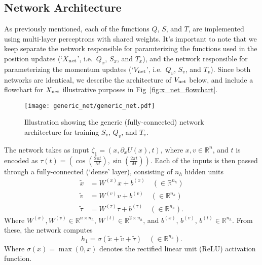 \documentclass[../main.tex]{subfiles}
\begin{document}
\subsection{Network Architecture}
As previously mentioned, each of the functions $Q$, $S$, and $T$, are implemented using multi-layer perceptrons with
shared weights.
%
It's important to note that we keep separate the network responsible for paramterizing the functions used in the
position updates (`${X_{\mathrm{net}}}$', i.e.\ $Q_x$, $S_x$, and $T_x$), and the network responsible for parameterizing the
momentum updates (`${V_{\mathrm{net}}}$', i.e.\ $Q_v$, $S_v$, and $T_v$).
%
Since both networks are identical, we describe the architecture of ${V_{\mathrm{net}}}$ below, and include a flowchart for ${X_{\mathrm{net}}}$ 
illustrative purposes in Fig~\ref{fig:x_net_flowchart}.
%
%
\begin{figure}[htpb]
  \centering
  \texttt{[image: generic\_net/generic\_net.pdf]}
  \caption{Illustration showing the generic (fully-connected) network architecture for training $S_v$, $Q_v$, and
  $T_v$.}%
\label{fig:generic_net}
\end{figure}
%
%
%
The network takes as input $\zeta_1 = (x, \partial_{x} U(x), t)$, where $x, v \in \mathbb{R}^{n}$, and $t$ is encoded
as $\tau(t) = \left(\cos{(\frac{2\pi t}{M})},\right.  \left.\sin{(\frac{2\pi t}{M})}\right)$.
%
Each of the inputs is then passed through a fully-connected (`dense' layer), consisting of $n_h$ hidden units
%
\begin{align}
    \tilde x &= W^{(x)} x + b^{(x)} \quad (\in \mathbb{R}^{n_h})\\
    \tilde v &= W^{(v)} v + b^{(v)} \quad (\in \mathbb{R}^{n_h})\\
    \tilde \tau &= W^{(\tau)} \tau + b^{(\tau)} \quad (\in \mathbb{R}^{n_h}).
\end{align}
%
Where $W^{(x)}, W^{(v)} \in \mathbb{R}^{n \times n_h}$, $W^{(t)} \in \mathbb{R}^{2 \times n_h}$, and $b^{(x)}$,
$b^{(v)}$,  $b^{(t)} \in \mathbb{R}^{n_h}$.
%
From these, the network computes
%
\begin{equation}
    h_1 = \sigma(\tilde x + \tilde v + \tilde \tau) \quad (\in
    \mathbb{R}^{n_h}).
    \label{eq:hidden_1}
\end{equation}
%
Where $\sigma(x) = \max(0, x)$ denotes the rectified linear unit (ReLU) activation function.
\end{document}
